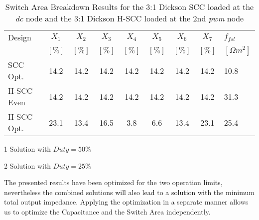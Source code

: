
\begin{table}[!th]
    \renewcommand{\arraystretch}{1.3}
    \setlength{\tabcolsep}{5pt}
    \begin{threeparttable}
    \centering
    \caption{Switch Area Breakdown Results for the 3:1 Dickson SCC loaded at
             the \emph{dc} node  and the 3:1 Dickson H-SCC loaded
              at the 2nd \emph{pwm} node}
    \label{tab:fsl_results}
    \begin{tabular}{ l | c | c | c | c | c | c | c | l }
      Design              & $X_1$   & $X_2$  & $X_3$  & $X_4$  & $X_5$  & $X_6$  & $X_7$  & $f_{fsl}$       \\
                          & $[\%]$  & $[\%]$ & $[\%]$ & $[\%]$ & $[\%]$ & $[\%]$ & $[\%]$ &  $[\Omega m^2]$ \\
                          \hline \hline
      SCC Opt.            &   14.2  &   14.2 &   14.2 &   14.2 &   14.2 &   14.2 &   14.2 &  10.8 \\
      \hline \hline
      H-SCC Even   &   14.2  &   14.2 &   14.2 &   14.2 &   14.2 &   14.2 &   14.2 &  31.3 \\
      H-SCC Opt.   &   23.1  &   13.4 &   16.5 &   3.8 &   6.6 &     13.4 &   23.1  & 25.4 \\

    \end{tabular}
     \begin{tablenotes}
        \item [1] Solution with $Duty = 50\%$
        \item [2] Solution with $Duty = 25\%$
    \end{tablenotes}
    \end{threeparttable}
\end{table}

The presented results have been optimized for the two operation limits, nevertheless the combined solutions will also lead to a solution with the minimum total output impedance. Applying the optimization in a separate manner allows us to optimize the Capacitance and the Switch Area independently.



